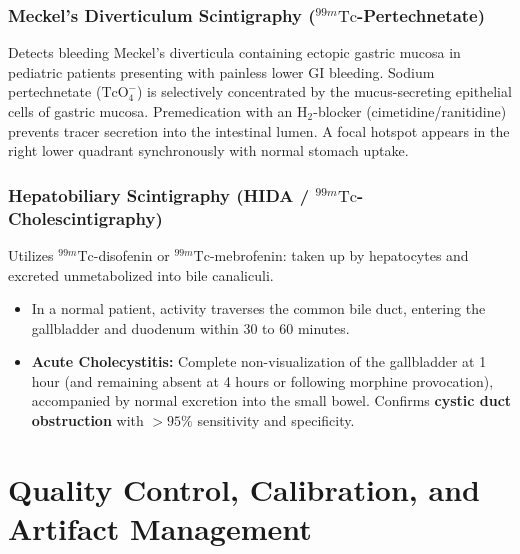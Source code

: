 \documentclass[11pt,a4paper]{article}
\begin{document}
\subsubsection{Meckel's Diverticulum Scintigraphy (\texorpdfstring{$^{99m}\text{Tc}$}{99mTc}-Pertechnetate)}
Detects bleeding Meckel's diverticula containing ectopic gastric mucosa in pediatric patients presenting with painless lower GI bleeding. Sodium pertechnetate ($\text{TcO}_4^-$) is selectively concentrated by the mucus-secreting epithelial cells of gastric mucosa. Premedication with an $\text{H}_2$-blocker (cimetidine/ranitidine) prevents tracer secretion into the intestinal lumen. A focal hotspot appears in the right lower quadrant synchronously with normal stomach uptake.

\subsubsection{Hepatobiliary Scintigraphy (HIDA / \texorpdfstring{$^{99m}\text{Tc}$}{99mTc}-Cholescintigraphy)}
Utilizes $^{99m}\text{Tc}$-disofenin or $^{99m}\text{Tc}$-mebrofenin: taken up by hepatocytes and excreted unmetabolized into bile canaliculi.
\begin{itemize}[leftmargin=*]
    \item In a normal patient, activity traverses the common bile duct, entering the gallbladder and duodenum within 30 to 60 minutes.
    \item \textbf{Acute Cholecystitis:} Complete non-visualization of the gallbladder at 1 hour (and remaining absent at 4 hours or following morphine provocation), accompanied by normal excretion into the small bowel. Confirms \textbf{cystic duct obstruction} with $> 95\%$ sensitivity and specificity.
\end{itemize}

\newpage
\section{Quality Control, Calibration, and Artifact Management}
\end{document}
